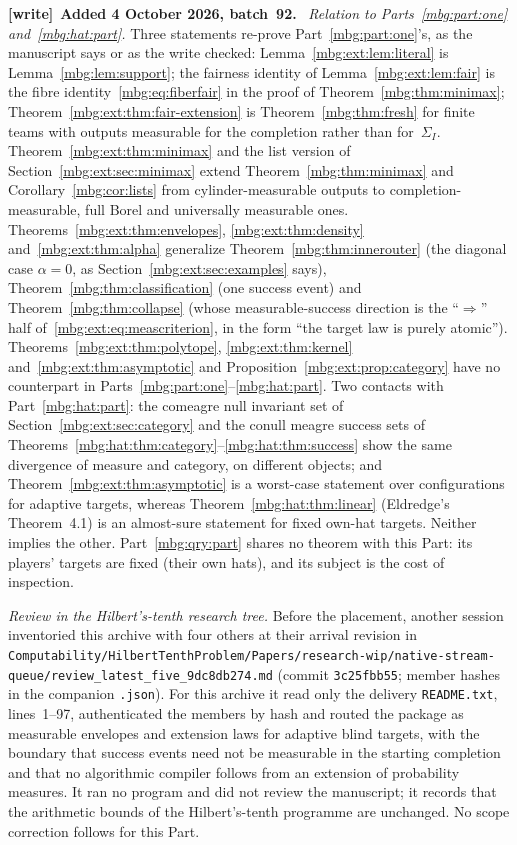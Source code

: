\documentclass[11pt,letterpaper]{article}
\theoremstyle{definition}
\newcommand{\Sig}{\Sigma}
\newenvironment{writenote}[1][]{\par\smallskip\begingroup\small
 \noindent\textbf{[write]}\if\relax\detokenize{#1}\relax\else~\textbf{#1.}\fi\ }%
 {\par\endgroup\smallskip}
\begin{document}
\begin{writenote}[Added 4 October 2026, batch~92]
\emph{Relation to Parts~\ref{mbg:part:one} and~\ref{mbg:hat:part}.} Three statements re-prove Part~\ref{mbg:part:one}'s, as the manuscript says or as the write checked: Lemma~\ref{mbg:ext:lem:literal} is Lemma~\ref{mbg:lem:support}; the fairness identity of Lemma~\ref{mbg:ext:lem:fair} is the fibre identity~\eqref{mbg:eq:fiberfair} in the proof of Theorem~\ref{mbg:thm:minimax}; Theorem~\ref{mbg:ext:thm:fair-extension} is Theorem~\ref{mbg:thm:fresh} for finite teams with outputs measurable for the completion rather than for~$\Sig_I$. Theorem~\ref{mbg:ext:thm:minimax} and the list version of Section~\ref{mbg:ext:sec:minimax} extend Theorem~\ref{mbg:thm:minimax} and Corollary~\ref{mbg:cor:lists} from cylinder-measurable outputs to completion-measurable, full Borel and universally measurable ones. Theorems~\ref{mbg:ext:thm:envelopes}, \ref{mbg:ext:thm:density} and~\ref{mbg:ext:thm:alpha} generalize Theorem~\ref{mbg:thm:innerouter} (the diagonal case $\alpha=0$, as Section~\ref{mbg:ext:sec:examples} says), Theorem~\ref{mbg:thm:classification} (one success event) and Theorem~\ref{mbg:thm:collapse} (whose measurable-success direction is the ``$\Rightarrow$'' half of~\eqref{mbg:ext:eq:meascriterion}, in the form ``the target law is purely atomic''). Theorems~\ref{mbg:ext:thm:polytope}, \ref{mbg:ext:thm:kernel} and~\ref{mbg:ext:thm:asymptotic} and Proposition~\ref{mbg:ext:prop:category} have no counterpart in Parts~\ref{mbg:part:one}--\ref{mbg:hat:part}. Two contacts with Part~\ref{mbg:hat:part}: the comeagre null invariant set of Section~\ref{mbg:ext:sec:category} and the conull meagre success sets of Theorems~\ref{mbg:hat:thm:category}--\ref{mbg:hat:thm:success} show the same divergence of measure and category, on different objects; and Theorem~\ref{mbg:ext:thm:asymptotic} is a worst-case statement over configurations for adaptive targets, whereas Theorem~\ref{mbg:hat:thm:linear} (Eldredge's Theorem~4.1) is an almost-sure statement for fixed own-hat targets. Neither implies the other. Part~\ref{mbg:qry:part} shares no theorem with this Part: its players' targets are fixed (their own hats), and its subject is the cost of inspection.

\emph{Review in the Hilbert's-tenth research tree.} Before the placement, another session inventoried this archive with four others at their arrival revision in \nolinkurl{Computability/HilbertTenthProblem/Papers/research-wip/native-stream-queue/review_latest_five_9dc8db274.md} (commit \texttt{3c25fbb55}; member hashes in the companion \texttt{.json}). For this archive it read only the delivery \texttt{README.txt}, lines~1--97, authenticated the members by hash and routed the package as measurable envelopes and extension laws for adaptive blind targets, with the boundary that success events need not be measurable in the starting completion and that no algorithmic compiler follows from an extension of probability measures. It ran no program and did not review the manuscript; it records that the arithmetic bounds of the Hilbert's-tenth programme are unchanged. No scope correction follows for this Part.


\end{writenote}
\end{document}
